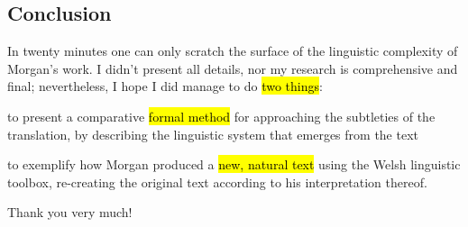 \begin{paper}
	\section{Conclusion}

	In twenty minutes one can only scratch the surface of the linguistic complexity of Morgan’s work. I didn’t present all details, nor my research is comprehensive and final; nevertheless, I hope I did manage to do \hl{two things}:
	\begin{compactitem}
		\item to present a comparative \hl{formal method} for approaching the subtleties of the translation, by describing the linguistic system that emerges from the text
		\item to exemplify how Morgan produced a \hl{new, natural text} using the Welsh linguistic toolbox, re-creating the original text according to his interpretation thereof.
	\end{compactitem}

	Thank you very much!
\end{paper}
